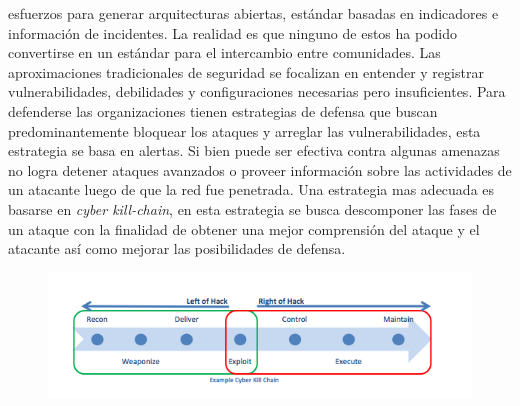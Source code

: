 esfuerzos para generar arquitecturas abiertas, estándar basadas en indicadores e 
información de incidentes. La realidad es que ninguno de estos ha podido 
convertirse en un estándar para el intercambio entre comunidades.
Las aproximaciones tradicionales de seguridad se focalizan en entender y 
registrar vulnerabilidades, debilidades y configuraciones necesarias pero 
insuficientes. Para defenderse las organizaciones tienen estrategias de defensa 
que buscan predominantemente bloquear los ataques y arreglar 
las vulnerabilidades, esta estrategia se basa en alertas. Si bien puede ser 
efectiva contra algunas amenazas no logra detener ataques avanzados o proveer 
información sobre las actividades de un atacante luego de que la red fue 
penetrada. Una estrategia mas adecuada es basarse en \emph{cyber kill-chain}, en 
esta estrategia se busca descomponer las fases de un ataque con la finalidad de 
obtener una mejor comprensión del ataque y el atacante así como mejorar las 
posibilidades de defensa.

\begin{figure}[ht!]
  \centering
    \includegraphics[width=150mm]{./Figures/killChain.png}
\end{figure}

